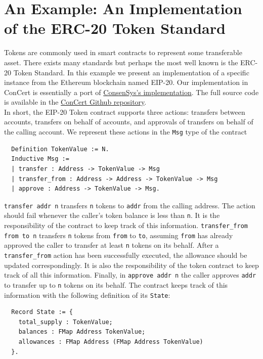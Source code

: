 \documentclass[twoside,11pt,openright]{report}
\newenvironment{code}{\captionsetup{type=figure, singlelinecheck=off, justification=raggedleft}}{}
\newcommand{\cc}{ConCert}
\newcommand{\coq}[1]{\texttt{#1}}
\begin{document}
\section{An Example: An Implementation of the ERC-20 Token Standard}
\label{sec:erc20-example}
Tokens are commonly used in smart contracts to represent some transferable asset. There exists many standards but perhaps the most well known is the ERC-20 Token Standard. In this example we present an implementation of a specific instance from the Ethereum blockchain named EIP-20\cite{eip20}. Our implementation in \cc{} is essentially a port of \href{https://github.com/ConsenSys/Tokens/blob/fdf687c69d998266a95f15216b1955a4965a0a6d/contracts/eip20/EIP-20.sol}{ConsenSys's implementation}. The full source code is available in the \href{https://github.com/AU-COBRA/ConCert/blob/master/execution/examples/EIP-20Token.v}{\cc{} Github repository}.
\medskip\\
In short, the EIP-20 Token contract supports three actions: transfers between accounts, transfers on behalf of accounts, and approvals of transfers on behalf of the calling account. We represent these actions in the \coq{Msg} type of the contract
\begin{code}
\label{def:EIP20-TokenValue}
\begin{verbatim}
  Definition TokenValue := N.
  Inductive Msg :=
  | transfer : Address -> TokenValue -> Msg
  | transfer_from : Address -> Address -> TokenValue -> Msg
  | approve : Address -> TokenValue -> Msg.
\end{verbatim}
\end{code}
\coq{transfer addr n} transfers \coq{n} tokens to \coq{addr} from the calling address. The action should fail whenever the caller's token balance is less than \coq{n}. It is the responsibility of the contract to keep track of this information. \coq{transfer\_from from to n} transfers \coq{n} tokens from \coq{from} to \coq{to}, assuming \coq{from} has already approved the caller to transfer at least \coq{n} tokens on its behalf. After a \coq{transfer\_from} action has been successfully executed, the allowance should be updated correspondingly. It is also the responsibility of the token contract to keep track of all this information. Finally, in \coq{approve addr n} the caller approves \coq{addr} to transfer up to \coq{n} tokens on its behalf. The contract keeps track of this information with the following definition of its \texttt{State}:
\begin{code}
\label{def:EIP20-State}
\begin{verbatim}
  Record State := {
    total_supply : TokenValue;
    balances : FMap Address TokenValue;
    allowances : FMap Address (FMap Address TokenValue)
  }.
\end{verbatim}
\end{code}
\end{document}
